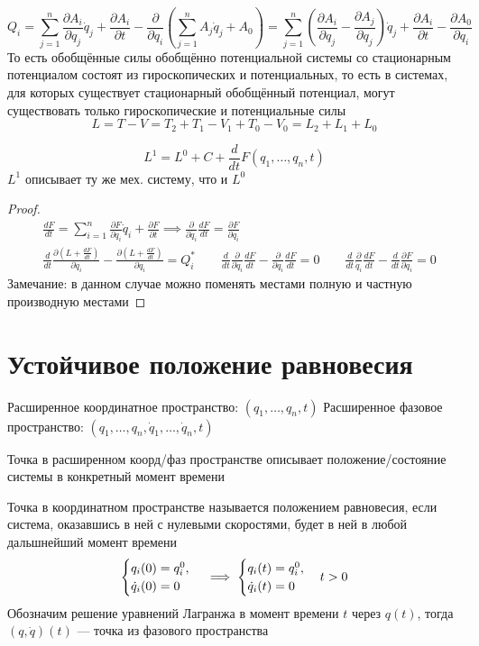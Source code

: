 \documentclass[crop=false]{standalone}
\begin{document}
\[Q_i = \sum_{j=1}^{n} \frac{\partial A_i}{\partial q_j} \dot q_j + \frac{\partial A_i}{\partial t} - \frac{\partial}{\partial q_i} \left( \sum_{j=1}^{n} A_j \dot q_j + A_0\right) = \sum_{j=1}^{n} \left(\frac{\partial A_i}{\partial q_j} - \frac{\partial A_j}{\partial q_j}\right) \dot q_j + \frac{\partial A_i}{\partial t} - \frac{\partial A_0}{\partial q_i}\]
То есть обобщённые силы обобщённо потенциальной системы со стационарным потенциалом состоят из гироскопических и потенциальных, то есть 
в системах, для которых существует стационарный обобщённый потенциал, могут существовать только гироскопические и потенциальные силы
\[L = T - V = T_2 + T_1 - V_1 + T_0 - V_0 = L_2 + L_1 + L_0\]

\noindent \keypoint \[L^1 = L^0 + C + \frac{d}{d t} F(q_1, \dots, q_n, t)\]
$L^1$ описывает ту же мех. систему, что и $L^0$
\begin{proof}
    \[
    \begin{aligned}
    &\frac{d F}{d t} = \sum_{i=1}^{n} \frac{\partial F}{\partial q_i} \dot q_i + \frac{\partial F}{\partial t} \implies \frac{\partial }{\partial \dot {q_i}}\frac{d F}{d t} = \frac{\partial F}{\partial q_i} \\
    &\frac{d}{d t} \frac{\partial ( L + \frac{d F}{d t})}{\partial \dot q_i} - \frac{\partial (L + \frac{d F}{d t})}{\partial q_i} = Q_i^* \qquad \frac{d }{d t } \frac{\partial }{\partial \dot q_i} \frac{d F}{d t} - \frac{\partial }{\partial q_i} \frac{d F}{d t} = 0 \qquad \frac{d }{d t} \frac{\partial}{\dot q_i} \frac{d F}{d t} - \frac{d}{d t}\frac{\partial F}{\partial q_i} = 0
    \end{aligned}
    \]
    Замечание: в данном случае можно поменять местами полную и частную производную местами
\end{proof}

\section{Устойчивое положение равновесия}
\Def Расширенное координатное пространство: $(q_1, \dots, q_n, t)$
\Def Расширенное фазовое пространство: $(q_1, \dots, q_n, \dot q_1, \dots, \dot q_n, t)$

Точка в расширенном коорд/фаз пространстве описывает положение/состояние системы в конкретный момент времени

\Def Точка в координатном пространстве называется положением равновесия, если система, оказавшись в ней с нулевыми скоростями, будет в ней в любой дальшнейший момент времени
\[\begin{cases}
    q_i(0) = q_i^0, \\
    \dot q_i (0) = 0
\end{cases} \implies 
\begin{cases}
    q_i(t) = q_i^0, \\
    \dot q_i(t) = 0
\end{cases} \\ t > 0\]
Обозначим решение уравнений Лагранжа в момент времени $t$ через $q(t)$, тогда $(q , \dot q)(t)$ — точка из фазового пространства
\end{document}
